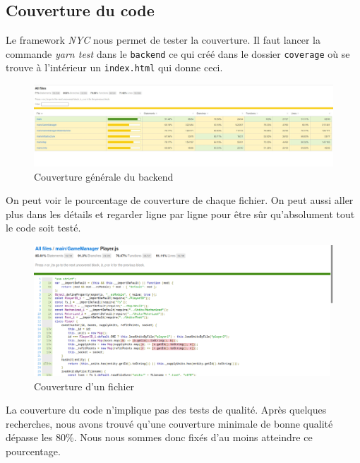 \subsection{Couverture du code}

Le framework \emph{NYC} nous permet de tester la couverture. Il faut lancer la commande \emph{yarn test} dans le \lstinline{backend} ce qui créé dans le dossier \lstinline{coverage} où se trouve à l'intérieur un \lstinline{index.html} qui donne ceci.

\begin{figure}[H]
    \centering
    \includegraphics[scale=0.35]{data/couverture_test_1.jpg}
    \caption{Couverture générale du backend}
\end{figure}

On peut voir le pourcentage de couverture de chaque fichier. On peut aussi aller plus dans les détails et regarder ligne par ligne pour être sûr qu'absolument tout le code soit testé.

\begin{figure}[H]
    \centering
    \includegraphics[scale=0.3]{data/couverture_test_2.png}
    \caption{Couverture d'un fichier}
\end{figure}

La couverture du code n'implique pas des tests de qualité. Après quelques recherches, nous avons trouvé qu'une couverture minimale de bonne qualité dépasse les 80\%. Nous nous sommes donc fixés d'au moins atteindre ce pourcentage.